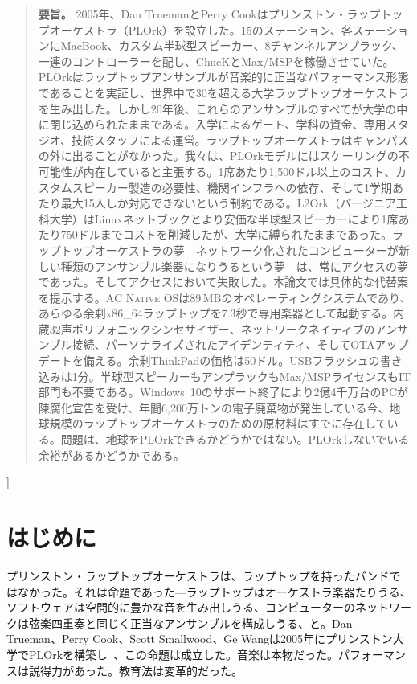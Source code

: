 \documentclass[10pt,letterpaper,twocolumn]{article}
\newcommand{\acos}{\textsc{AC Native OS}}
\begin{document}
{\begin{quote}
\small\noindent\textbf{要旨。}
2005年、Dan TruemanとPerry Cookはプリンストン・ラップトップオーケストラ（PLOrk）を設立した。15のステーション、各ステーションにMacBook、カスタム半球型スピーカー、8チャンネルアンプラック、一連のコントローラーを配し、ChucKとMax/MSPを稼働させていた。PLOrkはラップトップアンサンブルが音楽的に正当なパフォーマンス形態であることを実証し、世界中で30を超える大学ラップトップオーケストラを生み出した。しかし20年後、これらのアンサンブルのすべてが大学の中に閉じ込められたままである。入学によるゲート、学科の資金、専用スタジオ、技術スタッフによる運営。ラップトップオーケストラはキャンパスの外に出ることがなかった。我々は、PLOrkモデルにはスケーリングの不可能性が内在していると主張する。1席あたり1,500ドル以上のコスト、カスタムスピーカー製造の必要性、機関インフラへの依存、そして1学期あたり最大15人しか対応できないという制約である。L2Ork（バージニア工科大学）はLinuxネットブックとより安価な半球型スピーカーにより1席あたり750ドルまでコストを削減したが、大学に縛られたままであった。ラップトップオーケストラの夢---ネットワーク化されたコンピューターが新しい種類のアンサンブル楽器になりうるという夢---は、常にアクセスの夢であった。そしてアクセスにおいて失敗した。本論文では具体的な代替案を提示する。\acos{}は89\,MBのオペレーティングシステムであり、あらゆる余剰x86\_64ラップトップを7.3秒で専用楽器として起動する。内蔵32声ポリフォニックシンセサイザー、ネットワークネイティブのアンサンブル接続、パーソナライズされたアイデンティティ、そしてOTAアップデートを備える。余剰ThinkPadの価格は50ドル。USBフラッシュの書き込みは1分。半球型スピーカーもアンプラックもMax/MSPライセンスもIT部門も不要である。Windows~10のサポート終了により2億4千万台のPCが陳腐化宣告を受け、年間6,200万トンの電子廃棄物が発生している今、地球規模のラップトップオーケストラのための原材料はすでに存在している。問題は、地球をPLOrkできるかどうかではない。PLOrkしないでいる余裕があるかどうかである。
\end{quote}
\vspace{0.5em}
}]


\section{はじめに}

プリンストン・ラップトップオーケストラは、ラップトップを持ったバンドではなかった。それは命題であった---ラップトップはオーケストラ楽器たりうる、ソフトウェアは空間的に豊かな音を生み出しうる、コンピューターのネットワークは弦楽四重奏と同じく正当なアンサンブルを構成しうる、と。Dan Trueman、Perry Cook、Scott Smallwood、Ge Wangは2005年にプリンストン大学でPLOrkを構築し~\citep{trueman2006plork, trueman2007why}、この命題は成立した。音楽は本物だった。パフォーマンスは説得力があった。教育法は変革的だった。
\end{document}
